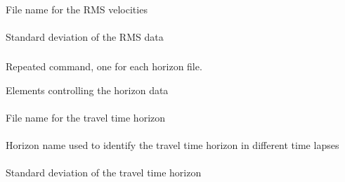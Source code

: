 \paragraph{}
 \slist
   \item \Description File name for the RMS velocities
   \item \Argument
   \item \Default
 \elist

\paragraph{}
 \slist
   \item \Description Standard deviation of the RMS data
   \item \Argument
   \item \Default
 \elist

\subsubsection{}
 \slist
   \item \Description Repeated command, one for each horizon file.
   \item \Argument Elements controlling the horizon data
   \item \Default
 \elist

\paragraph{}
 \slist
   \item \Description File name for the travel time horizon
   \item \Argument
   \item \Default
 \elist

\paragraph{}
 \slist
   \item \Description Horizon name used to identify the travel time horizon in different time lapses
   \item \Argument
   \item \Default
 \elist


\paragraph{}
 \slist
   \item \Description Standard deviation of the travel time horizon
   \item \Argument
   \item \Default
 \elist

